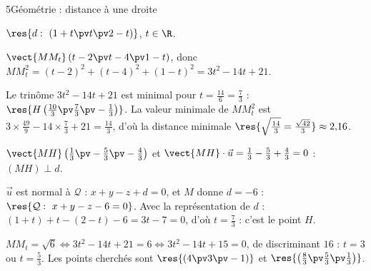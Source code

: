 \begin{corrigeBac}{5}{Géométrie : distance à une droite}
\begin{questions}
  \item $\res{d:\ (1+t\pv t\pv2-t)}$, $t\in\R$. 
  \item $\vect{MM_t}\,(t-2\pv t-4\pv1-t)$, donc $MM_t^{2}=(t-2)^{2}+(t-4)^{2}+(1-t)^{2}=3t^{2}-14t+21$. \pts{1 pt}
  \item Le trinôme $3t^{2}-14t+21$ est minimal pour $t=\frac{14}{6}=\frac73$ : $\res{H\left(\tfrac{10}{3}\pv\tfrac73\pv-\tfrac13\right)}$. La valeur
    minimale de $MM_t^{2}$ est $3\times\frac{49}9-14\times\frac73+21=\frac{14}{3}$, d'où la distance minimale $\res{\sqrt{\tfrac{14}{3}}=\tfrac{\sqrt{42}}{3}}\approx2{,}16$. 
  \item $\vect{MH}\left(\frac13\pv-\frac53\pv-\frac43\right)$ et $\vect{MH}\cdot\vec u=\frac13-\frac53+\frac43=0$ : $(MH)\perp d$. 
  \item $\vec u$ est normal à $\mathcal{Q}$ : $x+y-z+d=0$, et $M$ donne $d=-6$ : $\res{\mathcal{Q}:\ x+y-z-6=0}$. Avec la représentation
    de $d$ : $(1+t)+t-(2-t)-6=3t-7=0$, d'où $t=\frac73$ : c'est le point $H$. \pts{1 pt}
  \item $MM_t=\sqrt6\iff3t^{2}-14t+21=6\iff3t^{2}-14t+15=0$, de discriminant $16$ : $t=3$ ou $t=\frac53$. Les points cherchés sont
    $\res{(4\pv3\pv-1)}$ et $\res{\left(\tfrac83\pv\tfrac53\pv\tfrac13\right)}$. 
\end{questions}
\end{corrigeBac}
